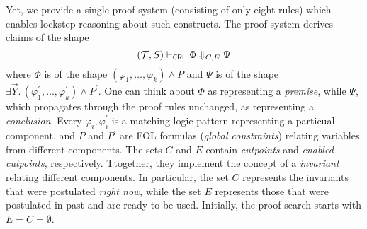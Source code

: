 Yet, we provide a single proof system (consisting of only eight rules) which enables lockstep reasoning about such constructs.
The proof system derives claims of the shape
\begin{equation*}
(\mathcal{T}, S) \vdash_{\mathsf{CRL}} \Phi \Downarrow_{C,E} \Psi
\end{equation*}
where $\Phi$ is of the shape $(\varphi_1, \ldots, \varphi_k) \land P$ and
$\Psi$ is of the shape
$\exists \vec{Y}.\, (\varphi^\prime_1, \ldots, \varphi^\prime_k) \land
P^\prime$.  One can think about $\Phi$ as representing a \emph{premise}, while
$\Psi$, which propagates through the proof rules unchanged, as representing a
\emph{conclusion}.  Every $\varphi_i, \varphi^\prime_i$ is a matching logic
pattern representing a particual component, and $P$ and $P^\prime$ are FOL
formulas (\emph{global constraints}) relating variables from different
components.  The sets $C$ and $E$ contain \emph{cutpoints} and \emph{enabled
  cutpoints}, respectively.  Ttogether, they implement the concept of a
\emph{invariant} relating different components.  In particular, the set $C$
represents the invariants that were postulated \emph{right now}, while the set
$E$ represents those that were postulated in past and are ready to be used.
Initially, the proof search starts with $E = C = \emptyset$.


